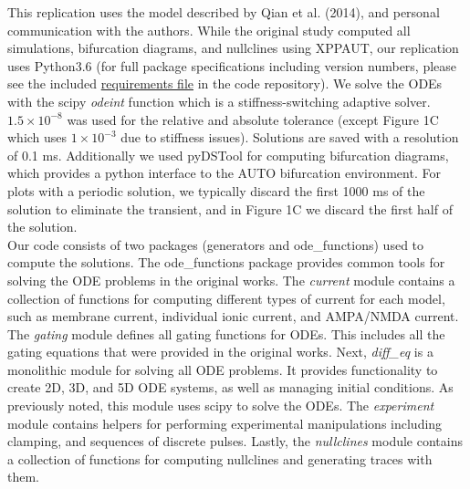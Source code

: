 This replication uses the model described by Qian et al. (2014), and personal communication with the authors. While the original study computed all simulations, bifurcation diagrams, and nullclines using XPPAUT, our replication uses Python3.6 (for full package specifications including version numbers, please see the included \href{https://github.com/mupsh/ReScience\_Qian\_2014/blob/master/requirements.txt}{requirements file} in the code repository). We solve the ODEs with the scipy \emph{odeint} function which is a stiffness-switching adaptive solver. $1.5\times 10^{-8}$ was used for the relative and absolute tolerance (except Figure 1C which uses $1\times 10^{-3}$ due to stiffness issues). Solutions are saved with a resolution of 0.1 ms. Additionally we used pyDSTool \cite{pydstool} for computing bifurcation diagrams, which provides a python interface to the AUTO bifurcation environment. For plots with a periodic solution, we typically discard the first 1000 ms of the solution to eliminate the transient, and in Figure 1C we discard the first half of the solution. \\

Our code consists of two packages (generators and ode\_functions) used to compute the solutions. The ode\_functions package provides common tools for solving the ODE problems in the original works. The \emph{current} module contains a collection of functions for computing different types of current for each model, such as membrane current, individual ionic current, and AMPA/NMDA current. The \emph{gating} module defines all gating functions for ODEs. This includes all the gating equations that were provided in the original works. Next, \emph{diff\_eq} is a monolithic module for solving all ODE problems. It provides functionality to create 2D, 3D, and 5D ODE systems, as well as managing initial conditions. As previously noted, this module uses scipy to solve the ODEs. The \emph{experiment} module contains helpers for performing experimental manipulations including clamping, and sequences of discrete pulses. Lastly, the \emph{nullclines} module contains a collection of functions for computing nullclines and generating traces with them.\\


